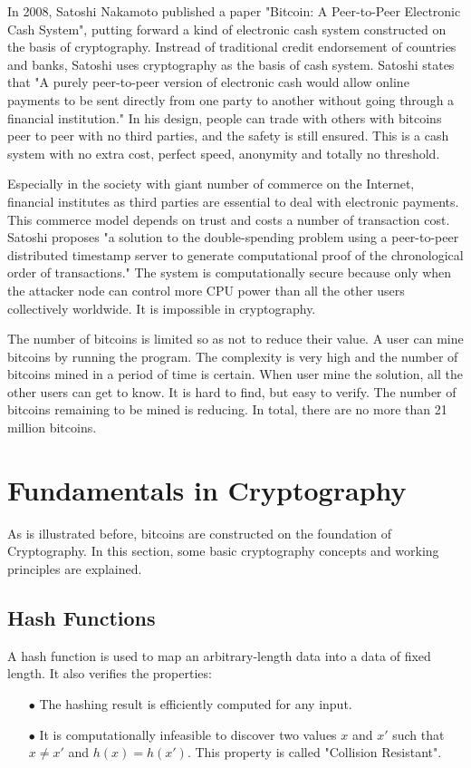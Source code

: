\documentclass[12pt,a4paper]{article}
\begin{document}
In 2008, Satoshi Nakamoto published a paper "Bitcoin: A Peer-to-Peer Electronic Cash System", putting forward a kind of electronic cash system constructed on the basis of cryptography. Instread of traditional credit endorsement of countries and banks, Satoshi uses cryptography as the basis of cash system. Satoshi states that "A purely peer-to-peer version of electronic cash would allow online payments to be sent directly from one party to another without going through a financial institution."\cite{0} In his design, people can trade with others with bitcoins peer to peer with no third parties, and the safety is still ensured. This is a cash system with no extra cost, perfect speed, anonymity and totally no threshold.  

Especially in the society with giant number of commerce on the Internet, financial institutes as third parties are essential to deal with electronic payments. This commerce model depends on trust and costs a number of transaction cost. Satoshi proposes "a solution to the double-spending problem using a peer-to-peer distributed timestamp server to generate computational proof of the chronological order of transactions."\cite{0} The system is computationally secure because only when the attacker node can control more CPU power than all the other users collectively worldwide. It is impossible in cryptography.

The number of bitcoins is limited so as not to reduce their value. A user can mine bitcoins by running the program. The complexity is very high and the number of bitcoins mined in a period of time is certain. When user mine the solution, all the other users can get to know. It is hard to find, but easy to verify. The number of bitcoins remaining to be mined is reducing. In total, there are no more than 21 million bitcoins. \cite{0}

\section{Fundamentals in Cryptography}

As is illustrated before, bitcoins are constructed on the foundation of Cryptography. In this section, some basic cryptography concepts and working principles are explained.

\subsection{Hash Functions}

A hash function is used to map an arbitrary-length data into a data of fixed length. It also verifies the properties:
\begin{enumerate}
    \item [$\bullet$] The hashing result is efficiently computed for any input.
    \item [$\bullet$] It is computationally infeasible to discover two values $x$ and $x'$ such that $x \neq x'$ and $h(x) = h(x')$. This property is called "Collision Resistant".
\end{enumerate}
\end{document}
